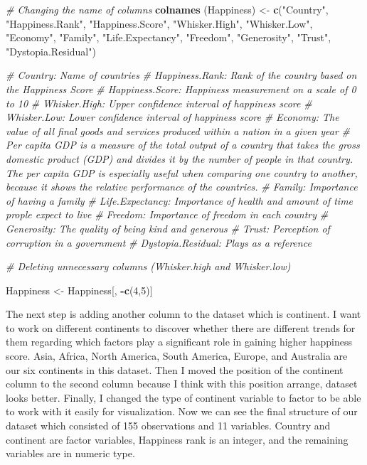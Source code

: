 \documentclass[
]{article}
\newenvironment{Shaded}{\begin{snugshade}}{\end{snugshade}}
\newcommand{\CommentTok}[1]{\textcolor[rgb]{0.56,0.35,0.01}{\textit{#1}}}
\newcommand{\DecValTok}[1]{\textcolor[rgb]{0.00,0.00,0.81}{#1}}
\newcommand{\FunctionTok}[1]{\textcolor[rgb]{0.13,0.29,0.53}{\textbf{#1}}}
\newcommand{\NormalTok}[1]{#1}
\newcommand{\OtherTok}[1]{\textcolor[rgb]{0.56,0.35,0.01}{#1}}
\newcommand{\SpecialCharTok}[1]{\textcolor[rgb]{0.81,0.36,0.00}{\textbf{#1}}}
\newcommand{\StringTok}[1]{\textcolor[rgb]{0.31,0.60,0.02}{#1}}
\begin{document}
\begin{Shaded}
\begin{Highlighting}[]
\CommentTok{\# Changing the name of columns}
\FunctionTok{colnames}\NormalTok{ (Happiness) }\OtherTok{\textless{}{-}} \FunctionTok{c}\NormalTok{(}\StringTok{"Country"}\NormalTok{, }\StringTok{"Happiness.Rank"}\NormalTok{, }\StringTok{"Happiness.Score"}\NormalTok{,}
                          \StringTok{"Whisker.High"}\NormalTok{, }\StringTok{"Whisker.Low"}\NormalTok{, }\StringTok{"Economy"}\NormalTok{, }\StringTok{"Family"}\NormalTok{,}
                          \StringTok{"Life.Expectancy"}\NormalTok{, }\StringTok{"Freedom"}\NormalTok{, }\StringTok{"Generosity"}\NormalTok{,}
                          \StringTok{"Trust"}\NormalTok{, }\StringTok{"Dystopia.Residual"}\NormalTok{)}


\CommentTok{\# Country: Name of countries}
\CommentTok{\# Happiness.Rank: Rank of the country based on the Happiness Score}
\CommentTok{\# Happiness.Score: Happiness measurement on a scale of 0 to 10}
\CommentTok{\# Whisker.High: Upper confidence interval of happiness score}
\CommentTok{\# Whisker.Low: Lower confidence interval of happiness score}
\CommentTok{\# Economy: The value of all final goods and services produced within a nation in a given year}
\CommentTok{\# Per capita GDP is a measure of the total output of a country that takes the gross domestic product (GDP) and divides it by the number of people in that country. The per capita GDP is especially useful when comparing one country to another, because it shows the relative performance of the countries.}
\CommentTok{\# Family: Importance of having a family}
\CommentTok{\# Life.Expectancy: Importance of health and amount of time prople expect to live}
\CommentTok{\# Freedom: Importance of freedom in each country}
\CommentTok{\# Generosity: The quality of being kind and generous}
\CommentTok{\# Trust: Perception of corruption in a government}
\CommentTok{\# Dystopia.Residual: Plays as a reference}

\CommentTok{\# Deleting unnecessary columns (Whisker.high and Whisker.low)}

\NormalTok{Happiness }\OtherTok{\textless{}{-}}\NormalTok{ Happiness[, }\SpecialCharTok{{-}}\FunctionTok{c}\NormalTok{(}\DecValTok{4}\NormalTok{,}\DecValTok{5}\NormalTok{)]}
\end{Highlighting}
\end{Shaded}

The next step is adding another column to the dataset which is
continent. I want to work on different continents to discover whether
there are different trends for them regarding which factors play a
significant role in gaining higher happiness score. Asia, Africa, North
America, South America, Europe, and Australia are our six continents in
this dataset. Then I moved the position of the continent column to the
second column because I think with this position arrange, dataset looks
better. Finally, I changed the type of continent variable to factor to
be able to work with it easily for visualization. Now we can see the
final structure of our dataset which consisted of 155 observations and
11 variables. Country and continent are factor variables, Happiness rank
is an integer, and the remaining variables are in numeric type.
\end{document}
